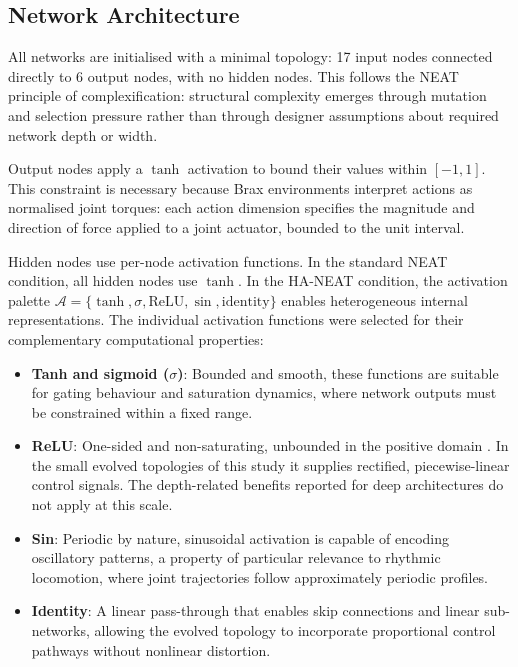 \documentclass[12pt]{article}
\begin{document}
\subsection{Network Architecture}
\label{subsec:network-architecture}

All networks are initialised with a minimal topology: 17 input nodes connected directly to 6 output nodes, with no hidden nodes.
This follows the NEAT principle of complexification: structural complexity emerges through mutation and selection pressure rather than through designer assumptions about required network depth or width.

Output nodes apply a $\tanh$ activation to bound their values within $[-1, 1]$.
This constraint is necessary because Brax environments interpret actions as normalised joint torques: each action dimension specifies the magnitude and direction of force applied to a joint actuator, bounded to the unit interval.

Hidden nodes use per-node activation functions.
In the standard NEAT condition, all hidden nodes use $\tanh$.
In the HA-NEAT condition, the activation palette $\mathcal{A} = \{\tanh, \sigma, \text{ReLU}, \sin, \text{identity}\}$ enables heterogeneous internal representations.
The individual activation functions were selected for their complementary computational properties:

\begin{itemize}
    \item \textbf{Tanh and sigmoid ($\sigma$)}: Bounded and smooth, these functions are suitable for gating behaviour and saturation dynamics, where network outputs must be constrained within a fixed range.
    \item \textbf{ReLU}: One-sided and non-saturating, unbounded in the positive domain \parencite{nair_rectified_2010}. In the small evolved topologies of this study it supplies rectified, piecewise-linear control signals. The depth-related benefits reported for deep architectures do not apply at this scale.
    \item \textbf{Sin}: Periodic by nature, sinusoidal activation is capable of encoding oscillatory patterns, a property of particular relevance to rhythmic locomotion, where joint trajectories follow approximately periodic profiles.
    \item \textbf{Identity}: A linear pass-through that enables skip connections and linear sub-networks, allowing the evolved topology to incorporate proportional control pathways without nonlinear distortion.
\end{itemize}
\end{document}
